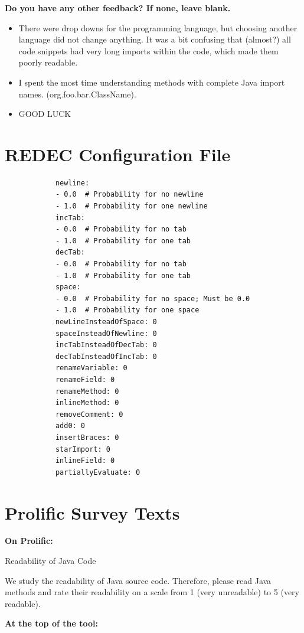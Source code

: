 \documentclass[%
class=scrreprt,
chapterprefix=false,%
open=right,%
twoside=true,%
paper=a4,%
logofile={Logo\_zentral\_farbig\_EN.png},%
thesistype=master,%
UKenglish,%
]{se2thesis}
\theoremstyle{definition}
\begin{document}
	\pagebreak
	
	\textbf{Do you have any other feedback? If none, leave blank.}
	\begin{itemize}
		\item There were drop downs for the programming language, but choosing another language did not change anything. It was a bit confusing that (almost?) all code snippets had very long imports within the code, which made them poorly readable.
		\item I spent the most time understanding methods with complete Java import names. (org.foo.bar.ClassName).
		\item GOOD LUCK
	\end{itemize}
	

\chapter{REDEC Configuration File}\label{appendix:rdh-config-file}
	\begin{listing}[h!]
		\begin{verbatim}
			newline:
			- 0.0  # Probability for no newline
			- 1.0  # Probability for one newline
			incTab:
			- 0.0  # Probability for no tab
			- 1.0  # Probability for one tab
			decTab:
			- 0.0  # Probability for no tab
			- 1.0  # Probability for one tab
			space:
			- 0.0  # Probability for no space; Must be 0.0
			- 1.0  # Probability for one space
			newLineInsteadOfSpace: 0
			spaceInsteadOfNewline: 0
			incTabInsteadOfDecTab: 0
			decTabInsteadOfIncTab: 0
			renameVariable: 0
			renameField: 0
			renameMethod: 0
			inlineMethod: 0
			removeComment: 0
			add0: 0
			insertBraces: 0
			starImport: 0
			inlineField: 0
			partiallyEvaluate: 0
		\end{verbatim}
		\label{lst:rdh-config-file}
	\end{listing}
	

\chapter{Prolific Survey Texts}\label{appendix:prolific-survey-texts}
	\textbf{On Prolific:}
	
	Readability of Java Code
	
	We study the readability of Java source code. Therefore, please read Java methods and rate their readability on a scale from 1 (very unreadable) to 5 (very readable).
	
	\textbf{At the top of the tool:}
	
\end{document}
